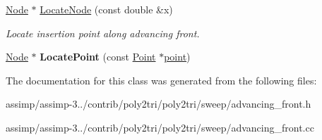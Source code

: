 \begin{DoxyCompactItemize}
\item 
\hypertarget{classp2t_1_1_advancing_front_a2fd35c4f0f200b5ead2e7f810837b135}{\hyperlink{structp2t_1_1_node}{Node} $\ast$ \hyperlink{classp2t_1_1_advancing_front_a2fd35c4f0f200b5ead2e7f810837b135}{Locate\+Node} (const double \&x)}\label{classp2t_1_1_advancing_front_a2fd35c4f0f200b5ead2e7f810837b135}

\begin{DoxyCompactList}\small\item\em Locate insertion point along advancing front. \end{DoxyCompactList}\item 
\hypertarget{classp2t_1_1_advancing_front_afbdb7f0670b0fa5b2733ac8aded17dfc}{\hyperlink{structp2t_1_1_node}{Node} $\ast$ {\bfseries Locate\+Point} (const \hyperlink{structp2t_1_1_point}{Point} $\ast$\hyperlink{structpoint}{point})}\label{classp2t_1_1_advancing_front_afbdb7f0670b0fa5b2733ac8aded17dfc}

\end{DoxyCompactItemize}


The documentation for this class was generated from the following files\+:\begin{DoxyCompactItemize}
\item 
assimp/assimp-\/3../contrib/poly2tri/poly2tri/sweep/advancing\+\_\+front.\+h\item 
assimp/assimp-\/3../contrib/poly2tri/poly2tri/sweep/advancing\+\_\+front.\+cc\end{DoxyCompactItemize}

